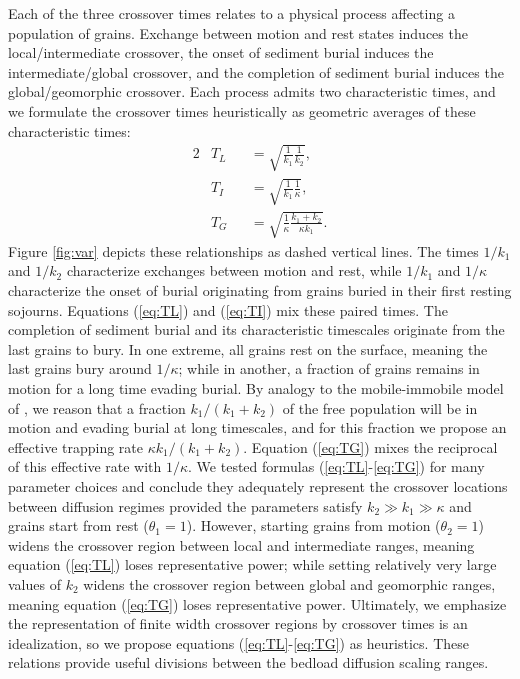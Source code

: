 \documentclass[draft,grl]{agujournal2018}
\begin{document}
Each of the three crossover times relates to a physical process affecting a population of grains.
Exchange between motion and rest states induces the local/intermediate crossover, the onset of sediment burial induces the intermediate/global crossover, and the completion of sediment burial induces the global/geomorphic crossover.
Each process admits two characteristic times, and we formulate the crossover times heuristically as geometric averages of these characteristic times:
\begin{alignat}{2}
&T_L &&= \sqrt{\frac{1}{k_1}\frac{1}{k_2}}, \label{eq:TL}\\
&T_I &&= \sqrt{\frac{1}{k_1}\frac{1}{\kappa}},\label{eq:TI}\\
&T_G &&= \sqrt{\frac{1}{\kappa}\frac{k_1+k_2}{\kappa k_1}} \label{eq:TG}.
\end{alignat}
Figure \ref{fig:var} depicts these relationships as dashed vertical lines.
The times $1/k_1$ and $1/k_2$ characterize exchanges between motion and rest, while $1/k_1$ and $1/\kappa$ characterize the onset of burial originating from grains buried in their first resting sojourns.
Equations (\ref{eq:TL}) and (\ref{eq:TI}) mix these paired times.
The completion of sediment burial and its characteristic timescales originate from the last grains to bury.
In one extreme, all grains rest on the surface, meaning the last grains bury around $1/\kappa$; while in another, a fraction of grains remains in motion for a long time evading burial.
By analogy to the mobile-immobile model of \citet{Ancey2006}, we reason that a fraction $k_1/(k_1+k_2)$ of the free population will be in motion and evading burial at long timescales, and for this fraction we propose an effective trapping rate $\kappa k_1/(k_1+k_2)$.
Equation (\ref{eq:TG}) mixes the reciprocal of this effective rate with $1/\kappa$.
We tested formulas (\ref{eq:TL}-\ref{eq:TG}) for many parameter choices and conclude they adequately represent the crossover locations between diffusion regimes provided the parameters satisfy $k_2\gg k_1 \gg \kappa$ and grains start from rest ($\theta_1=1$).
However, starting grains from motion ($\theta_2=1$) widens the crossover region between local and intermediate ranges, meaning equation (\ref{eq:TL}) loses representative power; while setting relatively very large values of $k_2$ widens the crossover region between global and geomorphic ranges, meaning equation (\ref{eq:TG}) loses representative power.
Ultimately, we emphasize the representation of finite width crossover regions by crossover times is an idealization, so we propose equations (\ref{eq:TL}-\ref{eq:TG}) as heuristics. 
These relations provide useful divisions between the bedload diffusion scaling ranges.
\end{document}

